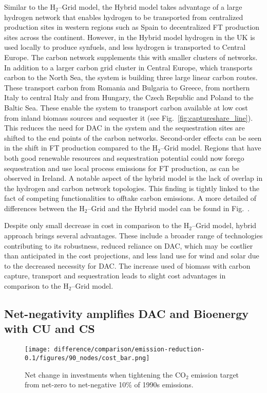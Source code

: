 \documentclass[twocolumn]{article}
\newcommand{\carbon}{CO$_2$}
\newcommand{\hydrogen}{H$_2$}
\newcommand{\hydrogengrid}{\hydrogen{}--Grid}
\begin{document}
Similar to the \hydrogengrid{} model, the Hybrid model takes advantage of a large hydrogen network that enables hydrogen to be transported from centralized production sites in western regions such as Spain to decentralized FT production sites across the continent. However, in the Hybrid model hydrogen in the UK is used locally to produce synfuels, and less hydrogen is transported to Central Europe.
The carbon network supplements this with smaller clusters of networks. In addition to a larger carbon grid cluster in Central Europe, which transports carbon to the North Sea, the system is building three large linear carbon routes. These transport carbon from Romania and Bulgaria to Greece, from northern Italy to central Italy and from Hungary, the Czech Republic and Poland to the Baltic Sea. These enable the system to transport carbon available at low cost from inland biomass sources and sequester it (see Fig.~\ref{fig:captureshare_line}). This reduces the need for DAC in the system and the sequestration sites are shifted to the end points of the carbon networks. Second-order effects can be seen in the shift in FT production compared to the \hydrogengrid{} model. Regions that have both good renewable resources and sequestration potential could now forego sequestration and use local process emissions for FT production, as can be observed in Ireland. A notable aspect of the hybrid model is the lack of overlap in the hydrogen and carbon network topologies. This finding is tightly linked to the fact of competing functionalities to offtake carbon emissions.
A more detailed of differences between the \hydrogengrid{} and the Hybrid model can be found in Fig.~.


Despite only small decrease in cost in comparison to the \hydrogengrid{} model, hybrid approach brings several advantages. These include a broader range of technologies contributing to its robustness, reduced reliance on DAC, which may be costlier than anticipated in the cost projections, and less land use for wind and solar due to the decreased necessity for DAC. The increase used of biomass with carbon capture, transport and sequestration leads to slight cost advantages in comparison to the \hydrogengrid{} model.


\subsection*{Net-negativity amplifies DAC and Bioenergy with CU and CS}

\begin{figure}[htb!]
    \centering
    \texttt{[image: difference/comparison/emission-reduction-0.1/figures/90\_nodes/cost\_bar.png]}
    \caption[short]{Net change in investments when tightening the \carbon{} emission target from net-zero to net-negative 10\% of 1990s emissions.}
    \label{fig:net-negative_cost_bar}
\end{figure}
\end{document}

